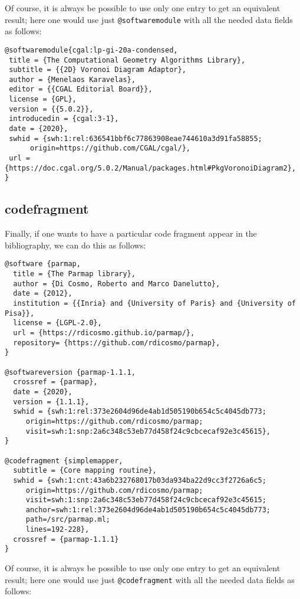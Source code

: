 Of course, it is always be possible to use only one entry to get an equivalent
result; here one would use just \texttt{@softwaremodule} with all the needed data
fields as follows:

\begin{verbatim}
@softwaremodule{cgal:lp-gi-20a-condensed,
 title = {The Computational Geometry Algorithms Library},
 subtitle = {{2D} Voronoi Diagram Adaptor},
 author = {Menelaos Karavelas},
 editor = {{CGAL Editorial Board}},
 license = {GPL},
 version = {{5.0.2}},
 introducedin = {cgal:3-1},
 date = {2020},
 swhid = {swh:1:rel:636541bbf6c77863908eae744610a3d91fa58855;
	  origin=https://github.com/CGAL/cgal/},
 url = {https://doc.cgal.org/5.0.2/Manual/packages.html#PkgVoronoiDiagram2},
}
\end{verbatim}

\subsection{codefragment}

Finally, if one wants to have a particular code fragment appear in the bibliography,
we can do this as follows:
\begin{verbatim}
@software {parmap,
  title = {The Parmap library},
  author = {Di Cosmo, Roberto and Marco Danelutto},
  date = {2012},
  institution = {{Inria} and {University of Paris} and {University of Pisa}},
  license = {LGPL-2.0},
  url = {https://rdicosmo.github.io/parmap/},
  repository= {https://github.com/rdicosmo/parmap},
}

@softwareversion {parmap-1.1.1,
  crossref = {parmap},
  date = {2020},
  version = {1.1.1},
  swhid = {swh:1:rel:373e2604d96de4ab1d505190b654c5c4045db773;
     origin=https://github.com/rdicosmo/parmap;
     visit=swh:1:snp:2a6c348c53eb77d458f24c9cbcecaf92e3c45615},
}

@codefragment {simplemapper,
  subtitle = {Core mapping routine},
  swhid = {swh:1:cnt:43a6b232768017b03da934ba22d9cc3f2726a6c5;
     origin=https://github.com/rdicosmo/parmap;
     visit=swh:1:snp:2a6c348c53eb77d458f24c9cbcecaf92e3c45615;
     anchor=swh:1:rel:373e2604d96de4ab1d505190b654c5c4045db773;
     path=/src/parmap.ml;
     lines=192-228},
  crossref = {parmap-1.1.1}
}
\end{verbatim}

Of course, it is always be possible to use only one entry to get an equivalent
result; here one would use just \texttt{@codefragment} with all the needed data
fields as follows:

